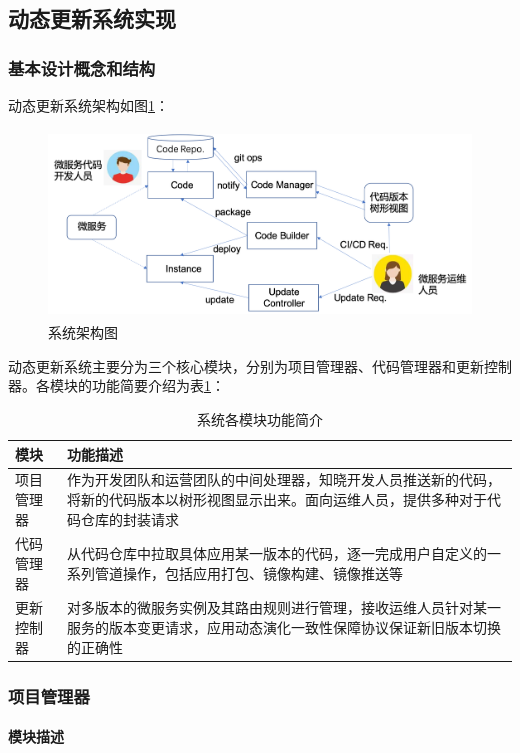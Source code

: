 \documentclass[a4paper, 12pt]{article}
\theoremstyle{definition}
\begin{document}
\subsection{动态更新系统实现}\label{section:MsDymEvo}

\subsubsection{基本设计概念和结构}
动态更新系统架构如图\ref{fig:sys_arch}：
\begin{figure}[!ht]
 \centering
 \includegraphics[height=5cm]{images/arch.png}
 \caption{系统架构图}
 \label{fig:sys_arch}
\end{figure}

动态更新系统主要分为三个核心模块，分别为项目管理器、代码管理器和更新控制器。各模块的功能简要介绍为表\ref{tab:func}：
\begin{table}[!htbp]
\centering
\begin{tabular}{p{5cm}p{8cm}}
  \toprule
  模块& 功能描述 \\
  \midrule
  项目管理器& 作为开发团队和运营团队的中间处理器，知晓开发人员推送新的代码，将新的代码版本以树形视图显示出来。面向运维人员，提供多种对于代码仓库的封装请求  \\
  \midrule
  代码管理器& 从代码仓库中拉取具体应用某一版本的代码，逐一完成用户自定义的一系列管道操作，包括应用打包、镜像构建、镜像推送等  \\
  \midrule
  更新控制器& 对多版本的微服务实例及其路由规则进行管理，接收运维人员针对某一服务的版本变更请求，应用动态演化一致性保障协议保证新旧版本切换的正确性 \\
  \bottomrule
\end{tabular}
\caption{系统各模块功能简介}
\label{tab:func}
\end{table}

\subsubsection{项目管理器}
\paragraph{模块描述}\mbox{}\\
\end{document}
